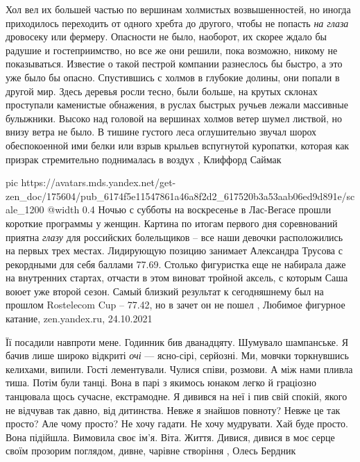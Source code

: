 Хол вел их большей частью по вершинам холмистых возвышенностей, но иногда
приходилось переходить от одного хребта до другого, чтобы не попасть \emph{на
глаза} дровосеку или фермеру. Опасности не было, наоборот, их скорее ждало бы
радушие и гостеприимство, но все же они решили, пока возможно, никому не
показываться.  Известие о такой пестрой компании разнеслось бы быстро, а это
уже было бы опасно.  Спустившись с холмов в глубокие долины, они попали в
другой мир. Здесь деревья росли тесно, были больше, на крутых склонах
проступали каменистые обнажения, в руслах быстрых ручьев лежали массивные
булыжники. Высоко над головой на вершинах холмов ветер шумел листвой, но внизу
ветра не было. В тишине густого леса оглушительно звучал шорох обеспокоенной
ими белки или взрыв крыльев вспугнутой куропатки, которая как призрак
стремительно поднималась в воздух
, Клиффорд Саймак

\ifcmt
  pic https://avatars.mds.yandex.net/get-zen_doc/175604/pub_6174f5e11547861a46a8f2d2_617520b3a53aab06ed9d891e/scale_1200
  @width 0.4
\fi
Ночью с субботы на воскресенье в Лас-Вегасе прошли короткие программы у женщин.
Картина по итогам первого дня соревнований приятна \emph{глазу} для российских
болельщиков – все наши девочки расположились на первых трех местах.
Лидирующую позицию занимает Александра Трусова с рекордными для себя баллами
77.69. Столько фигуристка еще не набирала даже на внутренних стартах, отчасти в
этом виноват тройной аксель, с которым Саша воюет уже второй сезон. Самый
близкий результат к сегодняшнему был на прошлом Rostelecom Cup – 77.42, но в
зачет он не пошел
, 
Любимое фигурное катание, zen.yandex.ru, 24.10.2021

Її посадили навпроти мене. Годинник бив дванадцяту. Шумувало шампанське. Я
бачив лише широко відкриті \emph{очі} — ясно-сірі, серйозні. Ми, мовчки
торкнувшись келихами, випили. Гості лементували. Чулися співи, розмови. А між
нами пливла тиша.  Потім були танці. Вона в парі з якимось юнаком легко й
граціозно танцювала щось сучасне, екстрамодне. Я дивився на неї і пив свій
спокій, якого не відчував так давно, від дитинства. Невже я знайшов повноту?
Невже це так просто?  Але чому просто? Не хочу гадати. Не хочу мудрувати.  Хай
буде просто.  Вона підійшла. Вимовила своє ім’я. Віта. Життя. Дивися, дивися в
моє серце своїм прозорим поглядом, дивне, чарівне створіння
, Олесь Бердник
